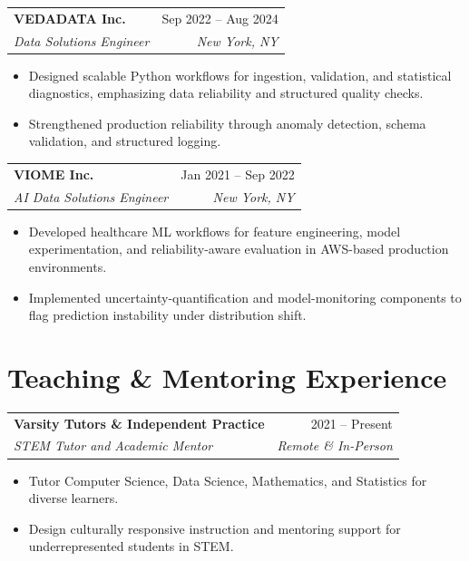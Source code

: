 \documentclass[11pt]{article}
\makeatletter
\newcommand{\entry}[4]{
  \noindent\begin{tabularx}{\textwidth}{@{}Xr@{}}
    \textbf{#1} & #2 \\
    \textit{#3} & \textit{#4}
  \end{tabularx}\vspace{2pt}
}
\makeatother
\begin{document}
\entry{VEDADATA Inc.}{Sep 2022 -- Aug 2024}{Data Solutions Engineer}{New York, NY}
\begin{itemize}
  \item Designed scalable Python workflows for ingestion, validation, and statistical diagnostics, emphasizing data reliability and structured quality checks.
  \item Strengthened production reliability through anomaly detection, schema validation, and structured logging.
\end{itemize}

\entry{VIOME Inc.}{Jan 2021 -- Sep 2022}{AI Data Solutions Engineer}{New York, NY}
\begin{itemize}
  \item Developed healthcare ML workflows for feature engineering, model experimentation, and reliability-aware evaluation in AWS-based production environments.
  \item Implemented uncertainty-quantification and model-monitoring components to flag prediction instability under distribution shift.
\end{itemize}

\section{Teaching \& Mentoring Experience}

\entry{Varsity Tutors \& Independent Practice}{2021 -- Present}{STEM Tutor and Academic Mentor}{Remote \& In-Person}
\begin{itemize}
  \item Tutor Computer Science, Data Science, Mathematics, and Statistics for diverse learners.
  \item Design culturally responsive instruction and mentoring support for underrepresented students in STEM.
\end{itemize}
\end{document}
